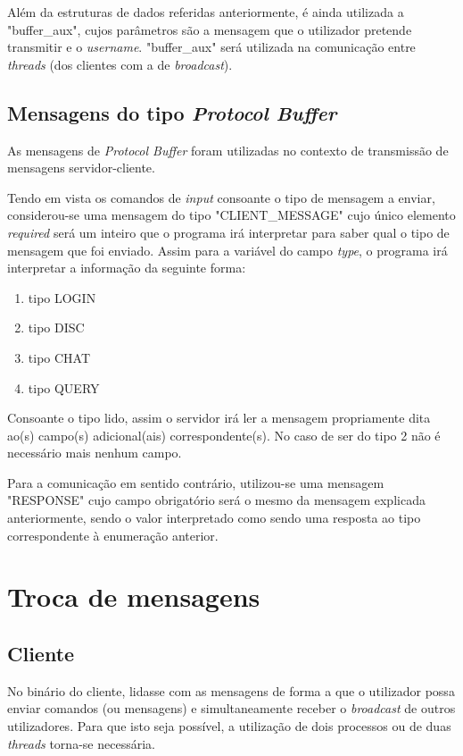 \documentclass[a4paper]{article}
\begin{document}
Além da estruturas de dados referidas anteriormente, é ainda utilizada a "buffer\_aux", cujos parâmetros são a mensagem que o utilizador pretende transmitir e o \textit{username}. "buffer\_aux" será utilizada na comunicação entre \textit{threads} (dos clientes com a de \textit{broadcast}).

\subsection{Mensagens do tipo \textit{Protocol Buffer}}

As mensagens de \textit{Protocol Buffer} foram utilizadas no contexto de transmissão de mensagens servidor-cliente.

Tendo em vista os comandos de \textit{input} consoante o tipo de mensagem a enviar, considerou-se uma mensagem do tipo "CLIENT\_MESSAGE" cujo único elemento \textit{required} será um inteiro que o programa irá interpretar para saber qual o tipo de mensagem que foi enviado. Assim para a variável do campo \textit{type}, o programa irá interpretar a informação da seguinte forma:

\begin{enumerate}
 \item tipo LOGIN
  \item tipo DISC
  \item tipo CHAT
  \item tipo QUERY
\end{enumerate}

Consoante o tipo lido, assim o servidor irá ler a mensagem propriamente dita ao(s) campo(s) adicional(ais) correspondente(s). No caso de ser do tipo 2 não é necessário mais nenhum campo.

Para a comunicação em sentido contrário, utilizou-se uma mensagem "RESPONSE" cujo campo obrigatório será o mesmo da mensagem explicada anteriormente, sendo o valor interpretado como sendo uma resposta ao tipo correspondente à enumeração anterior.

\section{Troca de mensagens}
\subsection{Cliente}
No binário do cliente, lidasse com as mensagens de forma a que o utilizador possa enviar comandos (ou mensagens) e simultaneamente receber o \textit{broadcast} de outros utilizadores. Para que isto seja possível, a utilização de dois processos ou de duas \textit{threads} torna-se necessária.
\end{document}
